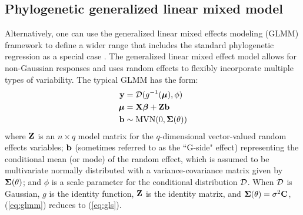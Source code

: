 \documentclass[12pt]{article}
\begin{document}


\subsection*{Phylogenetic generalized linear mixed model}
Alternatively, one can use the generalized linear mixed effects modeling (GLMM) framework to define a wider range that includes the standard phylogenetic regression as a special case \citep{lynch1991methods}.
The generalized linear mixed effect model allows for non-Gaussian responses and uses random effects to flexibly incorporate multiple types of variability.
The typical GLMM has the form:
\newcommand{\dist}{{\cal D}}
\begin{equation}
\begin{aligned}
\bY & = \dist(g^{-1}(\bmu), \phi) \\
\bmu & = \bX \bbeta + \bZ \bb  \\
\bb & \sim \textrm{MVN}(0, \bSigma(\theta))  \\
\label{eq:glmm}
\end{aligned}
\end{equation}
where ${\mathbf Z}$ is an $n \times q$ model matrix for the $q$-dimensional vector-valued random effects variables; ${\mathbf b}$ (sometimes referred to as the ``G-side" effect) representing the conditional mean (or mode) of the random effect, which is assumed to be multivariate normally distributed with a variance-covariance matrix given by ${\boldsymbol \Sigma}(\theta)$; and $\phi$ is a scale parameter for the conditional distribution $\dist$.
When $\dist$ is Gaussian, $g$ is the identity function, ${\mathbf Z}$ is the identity matrix, and ${\boldsymbol \Sigma}(\theta)=\sigma^2{\mathbf C}$, (\ref{eq:glmm}) reduces to (\ref{eq:gls}).
\end{document}
